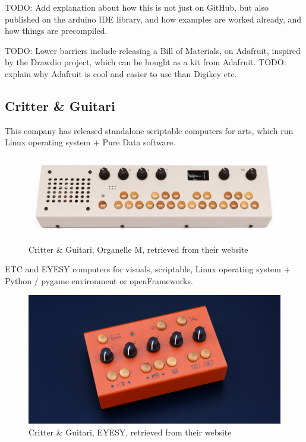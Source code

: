 TODO: Add explanation about how this is not just on GitHub, but also published on the arduino IDE library, and how examples are worked already, and how things are precompiled.

TODO: Lower barriers include releasing a Bill of Materials, on Adafruit, inspired by the Drawdio project, which can be bought as a kit from Adafruit. TODO: explain why Adafruit is cool and easier to use than Digikey etc.

\subsection{Critter \& Guitari}

This company has released standalone scriptable computers for arts, which run Linux operating system + Pure Data software.

\begin{figure}[h]
  \centering
  \includegraphics[width=0.75\linewidth,height=0.25\textheight,keepaspectratio]{images/critter-and-guitari-organelle-m.jpg}
  \caption{Critter \& Guitari, Organelle M, retrieved from their website}
  \label{fig:critter-and-guitari-organelle-m}
\end{figure}

ETC and EYESY computers for visuals, scriptable, Linux operating system + Python / pygame environment or openFrameworks.

\begin{figure}[h]
  \centering
  \includegraphics[width=0.75\linewidth,height=0.25\textheight,keepaspectratio]{images/critter-and-guitari-eyesy.jpg}
  \caption{Critter \& Guitari, EYESY, retrieved from their website}
  \label{fig:critter-and-guitari-eyesy}
\end{figure}

